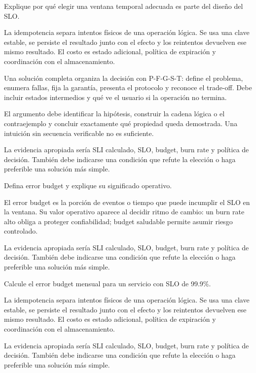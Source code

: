 \documentclass[variant=guia,cover=institutional,mode=screen]{ua-engineering-v6-article}
\begin{document}
\begin{uaexercise}
Explique por qué elegir una ventana temporal adecuada es parte del diseño del SLO.
\end{uaexercise}
\begin{uaanswer}
La idempotencia separa intentos físicos de una operación lógica. Se usa una clave estable, se persiste el resultado junto con el efecto y los reintentos devuelven ese mismo resultado. El costo es estado adicional, política de expiración y coordinación con el almacenamiento.

Una solución completa organiza la decisión con P-F-G-S-T: define el problema, enumera fallas, fija la garantía, presenta el protocolo y reconoce el trade-off. Debe incluir estados intermedios y qué ve el usuario si la operación no termina.

El argumento debe identificar la hipótesis, construir la cadena lógica o el contraejemplo y concluir exactamente qué propiedad queda demostrada. Una intuición sin secuencia verificable no es suficiente.

La evidencia apropiada sería SLI calculado, SLO, budget, burn rate y política de decisión. También debe indicarse una condición que refute la elección o haga preferible una solución más simple.
\end{uaanswer}

\begin{uaexercise}
Defina error budget y explique su significado operativo.
\end{uaexercise}
\begin{uaanswer}
El error budget es la porción de eventos o tiempo que puede incumplir el SLO en la ventana. Su valor operativo aparece al decidir ritmo de cambio: un burn rate alto obliga a proteger confiabilidad; budget saludable permite asumir riesgo controlado.

La evidencia apropiada sería SLI calculado, SLO, budget, burn rate y política de decisión. También debe indicarse una condición que refute la elección o haga preferible una solución más simple.
\end{uaanswer}

\begin{uaexercise}
Calcule el error budget mensual para un servicio con SLO de 99.9\%.
\end{uaexercise}
\begin{uaanswer}
La idempotencia separa intentos físicos de una operación lógica. Se usa una clave estable, se persiste el resultado junto con el efecto y los reintentos devuelven ese mismo resultado. El costo es estado adicional, política de expiración y coordinación con el almacenamiento.

La evidencia apropiada sería SLI calculado, SLO, budget, burn rate y política de decisión. También debe indicarse una condición que refute la elección o haga preferible una solución más simple.
\end{uaanswer}
\end{document}
